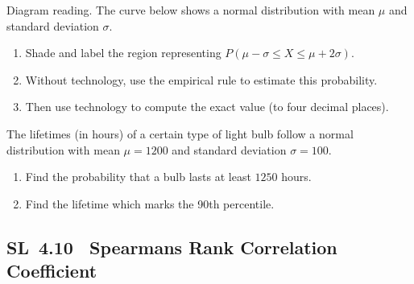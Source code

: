 \documentclass[11pt]{article}
\def\textbf#1{#1}%
\newcommand{\tocsubsection}[1]{\subsection{#1}}
\newcounter{question}
\begin{document}
\begin{question}
\textbf{Diagram reading.}
The curve below shows a normal distribution with mean $\mu$ and standard deviation $\sigma$.
\begin{enumerate}
  \item Shade and label the region representing $P(\mu-\sigma\le X\le\mu+2\sigma)$.
  \item Without technology, use the empirical rule to estimate this probability.
  \item Then use technology to compute the exact value (to four decimal places).
\end{enumerate}

\begin{center}
\end{center}
\end{question}


\begin{question}
The lifetimes (in hours) of a certain type of light bulb follow a normal distribution with mean $\mu=1200$ and standard deviation $\sigma=100$.
\begin{enumerate}[label=(\roman*)]
\item Find the probability that a bulb lasts at least $1250$ hours.
\item Find the lifetime which marks the 90th percentile.
\end{enumerate}
\end{question}



\tocsubsection{SL 4.10 \; Spearmans Rank Correlation Coefficient}

\newcommand{\pt}[2]{\fill (#1,#2) circle (1.6pt);} %
\end{document}
